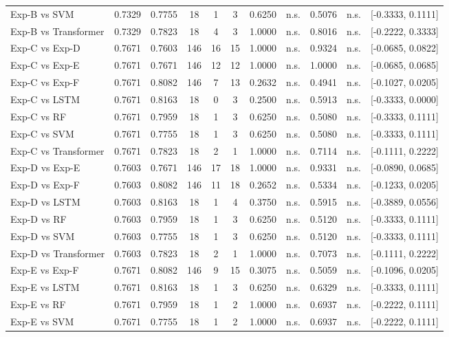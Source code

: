 \begin{table}[htbp]
{\begin{tabular}{l cc c cc cc cc c}
  Exp-B vs SVM & 0.7329 & 0.7755 & 18 & 1 & 3 & 0.6250 & n.s. & 0.5076 & n.s. & [-0.3333, 0.1111] \\
  Exp-B vs Transformer & 0.7329 & 0.7823 & 18 & 4 & 3 & 1.0000 & n.s. & 0.8016 & n.s. & [-0.2222, 0.3333] \\
  Exp-C vs Exp-D & 0.7671 & 0.7603 & 146 & 16 & 15 & 1.0000 & n.s. & 0.9324 & n.s. & [-0.0685, 0.0822] \\
  Exp-C vs Exp-E & 0.7671 & 0.7671 & 146 & 12 & 12 & 1.0000 & n.s. & 1.0000 & n.s. & [-0.0685, 0.0685] \\
  Exp-C vs Exp-F & 0.7671 & 0.8082 & 146 & 7 & 13 & 0.2632 & n.s. & 0.4941 & n.s. & [-0.1027, 0.0205] \\
  Exp-C vs LSTM & 0.7671 & 0.8163 & 18 & 0 & 3 & 0.2500 & n.s. & 0.5913 & n.s. & [-0.3333, 0.0000] \\
  Exp-C vs RF & 0.7671 & 0.7959 & 18 & 1 & 3 & 0.6250 & n.s. & 0.5080 & n.s. & [-0.3333, 0.1111] \\
  Exp-C vs SVM & 0.7671 & 0.7755 & 18 & 1 & 3 & 0.6250 & n.s. & 0.5080 & n.s. & [-0.3333, 0.1111] \\
  Exp-C vs Transformer & 0.7671 & 0.7823 & 18 & 2 & 1 & 1.0000 & n.s. & 0.7114 & n.s. & [-0.1111, 0.2222] \\
  Exp-D vs Exp-E & 0.7603 & 0.7671 & 146 & 17 & 18 & 1.0000 & n.s. & 0.9331 & n.s. & [-0.0890, 0.0685] \\
  Exp-D vs Exp-F & 0.7603 & 0.8082 & 146 & 11 & 18 & 0.2652 & n.s. & 0.5334 & n.s. & [-0.1233, 0.0205] \\
  Exp-D vs LSTM & 0.7603 & 0.8163 & 18 & 1 & 4 & 0.3750 & n.s. & 0.5915 & n.s. & [-0.3889, 0.0556] \\
  Exp-D vs RF & 0.7603 & 0.7959 & 18 & 1 & 3 & 0.6250 & n.s. & 0.5120 & n.s. & [-0.3333, 0.1111] \\
  Exp-D vs SVM & 0.7603 & 0.7755 & 18 & 1 & 3 & 0.6250 & n.s. & 0.5120 & n.s. & [-0.3333, 0.1111] \\
  Exp-D vs Transformer & 0.7603 & 0.7823 & 18 & 2 & 1 & 1.0000 & n.s. & 0.7073 & n.s. & [-0.1111, 0.2222] \\
  Exp-E vs Exp-F & 0.7671 & 0.8082 & 146 & 9 & 15 & 0.3075 & n.s. & 0.5059 & n.s. & [-0.1096, 0.0205] \\
  Exp-E vs LSTM & 0.7671 & 0.8163 & 18 & 1 & 3 & 0.6250 & n.s. & 0.6329 & n.s. & [-0.3333, 0.1111] \\
  Exp-E vs RF & 0.7671 & 0.7959 & 18 & 1 & 2 & 1.0000 & n.s. & 0.6937 & n.s. & [-0.2222, 0.1111] \\
  Exp-E vs SVM & 0.7671 & 0.7755 & 18 & 1 & 2 & 1.0000 & n.s. & 0.6937 & n.s. & [-0.2222, 0.1111] \\

\end{tabular}}
\end{table}
